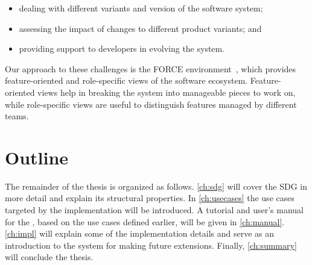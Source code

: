 \begin{itemize}
  \item dealing with different variants and version of the software system;
  \item assessing the impact of changes to different product variants; and
  \item providing support to developers in evolving the system.
\end{itemize}

Our approach to these challenges is the FORCE environment~\cite{HinterreiterDA}, which provides feature-oriented and 
role-specific views of the software ecosystem. Feature-oriented views help in breaking the system into manageable 
pieces to work on, while role-specific views are useful to distinguish features managed by different teams.


\section{Outline}

The remainder of the thesis is organized as follows.
\autoref{ch:sdg} will cover the SDG in more detail and explain its structural properties.
In \autoref{ch:usecases} the use cases targeted by the \SB implementation will be introduced.
A tutorial and user's manual for the \SB, based on the use cases defined earlier, will be given in \autoref{ch:manual}.
\autoref{ch:impl} will explain some of the implementation details and serve as an introduction to the system for making
future extensions.
Finally, \autoref{ch:summary} will conclude the thesis.
